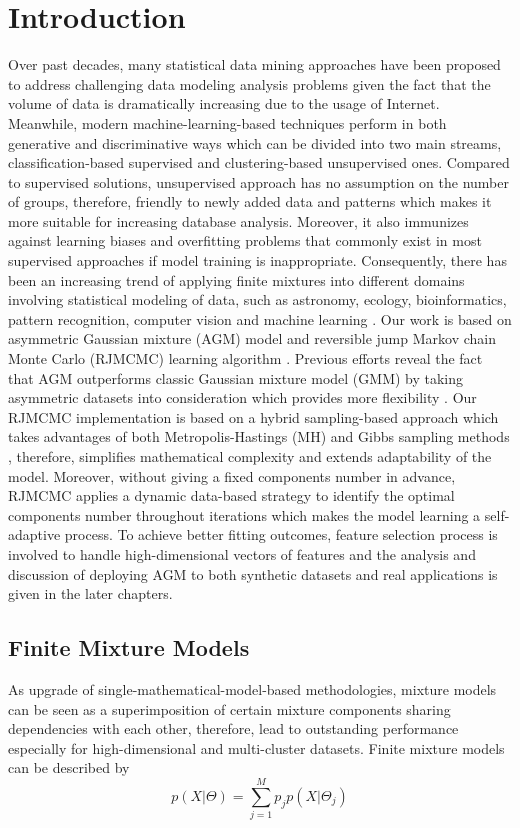\section{Introduction}
\label{intro}
Over past decades, many statistical data mining approaches have been proposed to address challenging data modeling analysis problems given the fact that the volume of data is dramatically increasing due to the usage of Internet. Meanwhile, modern machine-learning-based techniques perform in both generative and discriminative ways which can be divided into two main streams, classification-based supervised and clustering-based unsupervised ones. Compared to supervised solutions, unsupervised approach has no assumption on the number of groups, therefore, friendly to newly added data and patterns which makes it more suitable for increasing database analysis. Moreover, it also immunizes against learning biases and overfitting problems that commonly exist in most supervised approaches if model training is inappropriate. Consequently, there has been an increasing trend of applying finite mixtures into different domains involving statistical modeling of data, such as astronomy, ecology, bioinformatics, pattern recognition, computer vision and machine learning \cite{Bouguila2006}. Our work is based on asymmetric Gaussian mixture (AGM) model \cite{Elguebaly2014} and reversible jump Markov chain Monte Carlo (RJMCMC) learning algorithm \cite{Richardson1997}. Previous efforts reveal the fact that AGM outperforms classic Gaussian mixture model (GMM) by taking asymmetric datasets into consideration which provides more flexibility \cite{Elguebaly2013}. Our RJMCMC implementation is based on a hybrid sampling-based approach which takes advantages of both Metropolis-Hastings (MH) and Gibbs sampling methods \cite{Elguebaly2011}, therefore, simplifies mathematical complexity and extends adaptability of the model. Moreover, without giving a fixed components number in advance, RJMCMC applies a dynamic data-based strategy to identify the optimal components number throughout iterations which makes the model learning a self-adaptive process. To achieve better fitting outcomes, feature selection process is involved to handle high-dimensional vectors of features and the analysis and discussion of deploying AGM to both synthetic datasets and real applications is given in the later chapters.

\subsection{Finite Mixture Models}
\label{sec:1.1}
As upgrade of single-mathematical-model-based methodologies, mixture models \cite{Yang2015,Wen2015,Bouguila2011a} can be seen as a superimposition of certain mixture components sharing dependencies with each other, therefore, lead to outstanding performance especially for high-dimensional and multi-cluster datasets. Finite mixture models can be described by
\begin{equation}
p(X|\Theta) = \sum_{j=1}^Mp_jp(X|\Theta_j)
\label{eq:finiteMixture}
\end{equation}

